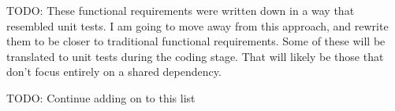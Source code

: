 \label{ch: functional}

TODO: These functional requirements were written down in a way that resembled unit tests. I am going to move away from this approach, and rewrite them to be closer to traditional functional requirements. Some of these will be translated to unit tests during the coding stage. That will likely be those that don't focus entirely on a shared dependency.

TODO: Continue adding on to this list